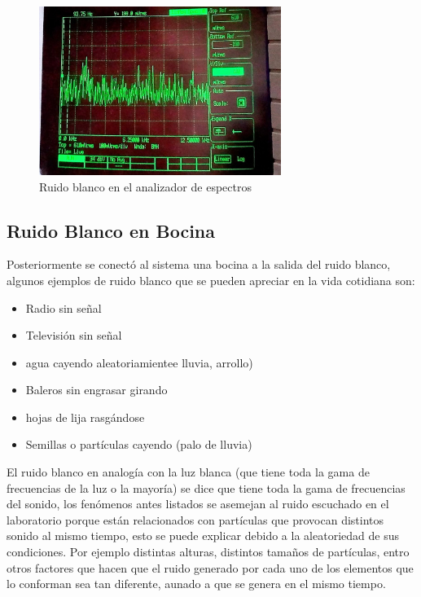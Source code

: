 \documentclass{article}
\begin{document}
\begin{figure}[h!]
    \centering
    \includegraphics[width=0.7\textwidth]{Imagenes/RuidoBlancoEspectros.jpg}
  
    \caption{Ruido blanco en el analizador de espectros}
    \label{fig:RuidoBlancoEspectros}
\end{figure}


\subsection{Ruido Blanco en Bocina}

Posteriormente se conectó al sistema una bocina a la salida del ruido blanco, algunos ejemplos de ruido blanco que se pueden apreciar en la vida cotidiana son:\\

\begin{itemize}
    \item Radio sin señal
    \item Televisión sin señal
    \item agua cayendo aleatoriamientee lluvia, arrollo)
    \item Baleros sin engrasar girando
    \item hojas de lija rasgándose
    \item Semillas o partículas cayendo (palo de lluvia)
\end{itemize}

El ruido blanco en analogía con la luz blanca (que tiene toda la gama de frecuencias de la luz o la mayoría) se dice que tiene toda la gama de frecuencias del sonido, los fenómenos antes listados se asemejan al ruido escuchado en el laboratorio porque están relacionados con partículas que provocan distintos sonido al mismo tiempo, esto se puede explicar debido a la aleatoriedad de sus condiciones. Por ejemplo distintas alturas, distintos tamaños de partículas, entro otros factores que hacen que el ruido generado por cada uno de los elementos que lo conforman sea tan diferente, aunado a que se genera en el mismo tiempo.\\
\end{document}
